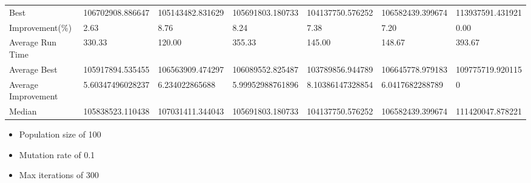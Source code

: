 \begin{table}[H]
{\begin{tabular}{lllllll}
\cellcolor[HTML]{ECF4FF}Best                & 106702908.886647 & 105143482.831629 & 105691803.180733 & 104137750.576252 & 106582439.399674 & 113937591.431921 \\
\cellcolor[HTML]{ECF4FF}Improvement(\%)     & 2.63             & 8.76             & 8.24             & 7.38             & 7.20             & 0.00             \\
\rowcolor[HTML]{CBCEFB} 
\cellcolor[HTML]{DAE8FC}Average Run Time    & 330.33           & 120.00           & 355.33           & 145.00           & 148.67           & 393.67           \\
\rowcolor[HTML]{CBCEFB} 
\cellcolor[HTML]{DAE8FC}Average Best        & 105917894.535455 & 106563909.474297 & 106089552.825487 & 103789856.944789 & 106645778.979183 & 109775719.920115 \\
\rowcolor[HTML]{CBCEFB} 
\cellcolor[HTML]{DAE8FC}Average Improvement & 5.60347496028237 & 6.234022865688   & 5.99952988761896 & 8.10386147328854 & 6.0417682288789  & 0                \\
\rowcolor[HTML]{CBCEFB} 
\cellcolor[HTML]{DAE8FC}Median              & 105838523.110438 & 107031411.344043 & 105691803.180733 & 104137750.576252 & 106582439.399674 & 111420047.878221
\end{tabular}%
}
\end{table}

\begin{itemize}
  \item Population size of 100
  \item Mutation rate of 0.1
  \item Max iterations of 300
\end{itemize}

